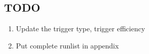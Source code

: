 \subsection{TODO}
\begin{enumerate}
\item Update the trigger type, trigger efficiency
\item Put complete runlist in appendix
\end{enumerate}

\begin{comment}

TO BE PUT IN THE APPENDIX

\begin{table}
\center
\begin{tabularx}{\textwidth}{c|X}
Dataset		&Runlist\\
\hline
LHC10b		&117222, 117220, 117116, 117112, 117099, 117092, 117063, 117060, 117059, 117053, 117052, 117050, 117048, 116645, 116643, 116574, 116571, 116562, 116403, 116402, 116288, 116102, 116081, 116079, 115414, 115401, 115399, 115393, 115345, 115335, 115328, 115322, 115318, 115310, 115193, 115186, 114931, 114930, 114924, 114918, 114798, 114786\\
					\hline
LHC10c		&121040, 121039, 120829, 120825, 120824, 120823, 120822, 120821, 120758, 120750, 120741, 120671, 120617, 120616, 120505, 120503, 120244, 120079, 120076, 120073, 120072, 120069, 120067, 119862, 119859, 119856, 119853, 119849, 119846, 119845, 119844, 119842, 119841, 118561, 118560, 118558, 118556, 118518, 118506\\
					\hline
LHC10d		&126158 , 126097, 126090, 126088, 126082, 126081, 126078, 126073, 126008, 126007, 126004, 125855, 125851, 125850, 125849, 125848, 125847, 125844, 125843, 125842, 125633, 125632, 125630, 125628, 125296, 125134, 125101, 125100, 125097, 125085, 125083, 125023, 122375, 122374\\
					\hline
LHC10e		&130850, 130848, 130847, 130844, 130842, 130840, 130834, 130799, 130798, 130795, 130793, 130704, 130696, 130628, 130623, 130621, 130620, 130609, 130608, 130524, 130520, 130519, 130517, 130481, 130480, 130479, 130375, 130178, 130172, 130168, 130158, 130157, 130149, 129983, 129966, 129962, 129961, 129960, 129744, 129742, 129738, 129736, 129735, 129734, 129729, 129726, 129725, 129723, 129666, 129659, 129653, 129652, 129651, 129650, 129647, 129641, 129639, 129599, 129587, 129586, 129540, 129536, 129528, 129527, 129525, 129524, 129523, 129521, 129520, 129514, 129513, 129512, 129042, 128913, 128855, 128853, 128850, 128843, 128836, 128835, 128834, 128833, 128824, 128823, 128820, 128819, 128778, 128777, 128678, 128677, 128621, 128615, 128611, 128609, 128605, 128582, 128506, 128505, 128504, 128503, 128498, 128495, 128494, 128486\\			

\end{comment}
